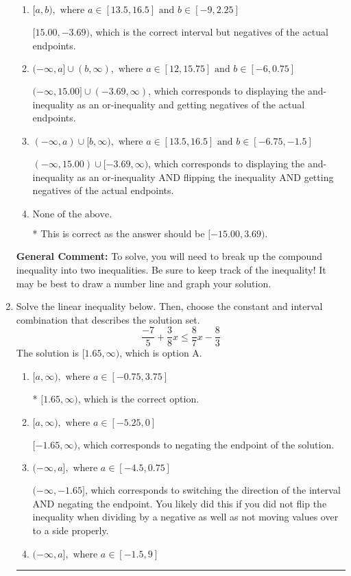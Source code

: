 \documentclass{extbook}[14pt]
\newcommand{\litem}[1]{\item #1

\rule{\textwidth}{0.4pt}}
\begin{document}
\begin{enumerate}
{\begin{enumerate}[label=\Alph*.]
$(15.00, -3.69]$, which corresponds to flipping the inequality and getting negatives of the actual endpoints.
\item \( [a, b), \text{ where } a \in [13.5, 16.5] \text{ and } b \in [-9, 2.25] \)

$[15.00, -3.69)$, which is the correct interval but negatives of the actual endpoints.
\item \( (-\infty, a] \cup (b, \infty), \text{ where } a \in [12, 15.75] \text{ and } b \in [-6, 0.75] \)

$(-\infty, 15.00] \cup (-3.69, \infty)$, which corresponds to displaying the and-inequality as an or-inequality and getting negatives of the actual endpoints.
\item \( (-\infty, a) \cup [b, \infty), \text{ where } a \in [13.5, 16.5] \text{ and } b \in [-6.75, -1.5] \)

$(-\infty, 15.00) \cup [-3.69, \infty)$, which corresponds to displaying the and-inequality as an or-inequality AND flipping the inequality AND getting negatives of the actual endpoints.
\item \( \text{None of the above.} \)

* This is correct as the answer should be $[-15.00, 3.69)$.
\end{enumerate}

\textbf{General Comment:} To solve, you will need to break up the compound inequality into two inequalities. Be sure to keep track of the inequality! It may be best to draw a number line and graph your solution.
}
\litem{
Solve the linear inequality below. Then, choose the constant and interval combination that describes the solution set.
\[ \frac{-7}{5} + \frac{3}{8} x \leq \frac{8}{7} x - \frac{8}{3} \]The solution is \( [1.65, \infty) \), which is option A.\begin{enumerate}[label=\Alph*.]
\item \( [a, \infty), \text{ where } a \in [-0.75, 3.75] \)

* $[1.65, \infty)$, which is the correct option.
\item \( [a, \infty), \text{ where } a \in [-5.25, 0] \)

 $[-1.65, \infty)$, which corresponds to negating the endpoint of the solution.
\item \( (-\infty, a], \text{ where } a \in [-4.5, 0.75] \)

 $(-\infty, -1.65]$, which corresponds to switching the direction of the interval AND negating the endpoint. You likely did this if you did not flip the inequality when dividing by a negative as well as not moving values over to a side properly.
\item \( (-\infty, a], \text{ where } a \in [-1.5, 9] \)


\end{enumerate}}
\end{enumerate}
\end{document}
